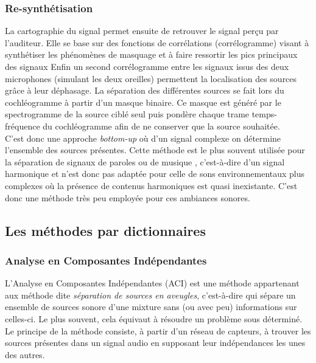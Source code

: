 \subsubsection{Re-synthétisation}



La cartographie du signal permet ensuite de retrouver le signal perçu par l'auditeur. Elle se base sur des fonctions de corrélations (corrélogramme) visant à synthétiser les phénomènes de masquage et à faire ressortir les pics principaux des signaux
Enfin un second corrélogramme entre les signaux issus des deux microphones (simulant les deux oreilles) permettent la localisation des sources grâce à leur déphasage. La séparation des différentes sources se fait lors du cochléogramme à partir d'un masque binaire. Ce masque est généré par le spectrogramme de la source ciblé seul  puis pondère chaque trame \og temps-fréquence \fg{} du cochléogramme afin de ne conserver que la source souhaitée.\\

C'est donc une approche \textit{bottom-up} où d'un signal complexe on détermine l'ensemble des sources présentes.  Cette méthode est le plus souvent utilisée pour la séparation de signaux de paroles ou de musique \cite{BrownCASASpeech}, c'est-à-dire d'un signal harmonique et n'est donc pas adaptée pour celle de sons environnementaux plus complexes où la présence de contenus harmoniques est quasi inexistante. C'est donc une méthode très peu employée pour ces ambiances sonores.

\subsection{Les méthodes par dictionnaires}

\subsubsection{Analyse en Composantes Indépendantes}\label{part:ACI}

L'Analyse en Composantes Indépendantes (ACI) \cite{Herault} \cite{Comon} est une méthode appartenant aux méthode dite \textit{séparation de sources en aveugles}, c'est-à-dire qui sépare un ensemble de sources sonore d'une mixture sans (ou avec peu) informations sur celles-ci. Le plus souvent, cela équivaut à résoudre un problème sous déterminé. Le principe de la méthode consiste, à partir d'un réseau de capteurs, à trouver les sources présentes dans un signal audio en supposant leur indépendances les unes des autres. \\

